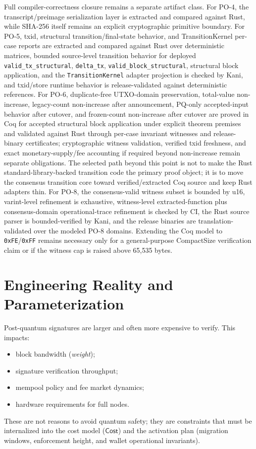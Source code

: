 \documentclass[11pt]{article}
\newcommand{\Cost}{\mathsf{Cost}}
\begin{document}
Full compiler-correctness closure remains a separate artifact class. For PO-4, the transcript/preimage serialization layer is extracted and compared against Rust, while SHA-256 itself remains an explicit cryptographic primitive boundary. For PO-5, txid, structural transition/final-state behavior, and TransitionKernel per-case reports are extracted and compared against Rust over deterministic matrices, bounded source-level transition behavior for deployed \texttt{valid\_tx\_structural}, \texttt{delta\_tx}, \texttt{valid\_block\_structural}, structural block application, and the \texttt{TransitionKernel} adapter projection is checked by Kani, and txid/store runtime behavior is release-validated against deterministic references. For PO-6, duplicate-free UTXO-domain preservation, total-value non-increase, legacy-count non-increase after announcement, PQ-only accepted-input behavior after cutover, and frozen-count non-increase after cutover are proved in Coq for accepted structural block application under explicit theorem premises and validated against Rust through per-case invariant witnesses and release-binary certificates; cryptographic witness validation, verified txid freshness, and exact monetary-supply/fee accounting if required beyond non-increase remain separate obligations. The selected path beyond this point is not to make the Rust standard-library-backed transition code the primary proof object; it is to move the consensus transition core toward verified/extracted Coq source and keep Rust adapters thin. For PO-8, the consensus-valid witness subset is bounded by u16, varint-level refinement is exhaustive, witness-level extracted-function plus consensus-domain operational-trace refinement is checked by CI, the Rust source parser is bounded-verified by Kani, and the release binaries are translation-validated over the modeled PO-8 domains. Extending the Coq model to \texttt{0xFE}/\texttt{0xFF} remains necessary only for a general-purpose CompactSize verification claim or if the witness cap is raised above 65{,}535 bytes.

\section{Engineering Reality and Parameterization}\label{sec:engineering}

Post-quantum signatures are larger and often more expensive to verify.
This impacts:
\begin{itemize}[leftmargin=2em]
  \item block bandwidth (\emph{weight});
  \item signature verification throughput;
  \item mempool policy and fee market dynamics;
  \item hardware requirements for full nodes.
\end{itemize}
These are not reasons to avoid quantum safety; they are constraints that must be internalized into the cost model ($\Cost$) and the activation plan (migration windows, enforcement height, and wallet operational invariants).
\end{document}
